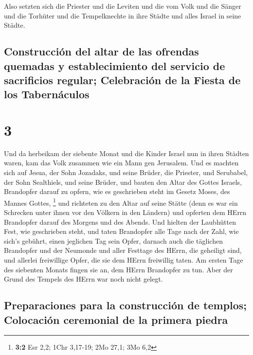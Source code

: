  Also setzten sich die Priester und die Leviten und die
vom Volk und die Sänger und die Torhüter und die Tempelknechte in ihre
Städte und alles Israel in seine Städte.

\hypertarget{construcciuxf3n-del-altar-de-las-ofrendas-quemadas-y-establecimiento-del-servicio-de-sacrificios-regular-celebraciuxf3n-de-la-fiesta-de-los-tabernuxe1culos}{%
\subsection{Construcción del altar de las ofrendas quemadas y
establecimiento del servicio de sacrificios regular; Celebración de la
Fiesta de los
Tabernáculos}\label{construcciuxf3n-del-altar-de-las-ofrendas-quemadas-y-establecimiento-del-servicio-de-sacrificios-regular-celebraciuxf3n-de-la-fiesta-de-los-tabernuxe1culos}}

\hypertarget{section-2}{%
\section{3}\label{section-2}}

 Und da herbeikam der siebente Monat und die Kinder Israel
nun in ihren Städten waren, kam das Volk zusammen wie ein Mann gen
Jerusalem.  Und es machten sich auf Jesua, der Sohn
Jozadaks, und seine Brüder, die Priester, und Serubabel, der Sohn
Sealthiels, und seine Brüder, und bauten den Altar des Gottes Israels,
Brandopfer darauf zu opfern, wie es geschrieben steht im Gesetz Moses,
des Mannes Gottes, \footnote{\textbf{3:2} Esr 2,2; 1Chr 3,17-19; 2Mo
  27,1; 3Mo 6,2}  und richteten zu den Altar auf seine
Stätte (denn es war ein Schrecken unter ihnen vor den Völkern in den
Ländern) und opferten dem HErrn Brandopfer darauf des Morgens und des
Abends.  Und hielten der Laubhütten Fest, wie geschrieben
steht, und taten Brandopfer alle Tage nach der Zahl, wie sich's gebührt,
einen jeglichen Tag sein Opfer,  darnach auch die
täglichen Brandopfer und der Neumonde und aller Festtage des HErrn, die
geheiligt sind, und allerlei freiwillige Opfer, die sie dem HErrn
freiwillig taten.  Am ersten Tage des siebenten Monats
fingen sie an, dem HErrn Brandopfer zu tun. Aber der Grund des Tempels
des HErrn war noch nicht gelegt.

\hypertarget{preparaciones-para-la-construcciuxf3n-de-templos-colocaciuxf3n-ceremonial-de-la-primera-piedra}{%
\subsection{Preparaciones para la construcción de templos; Colocación
ceremonial de la primera
piedra}\label{preparaciones-para-la-construcciuxf3n-de-templos-colocaciuxf3n-ceremonial-de-la-primera-piedra}}

